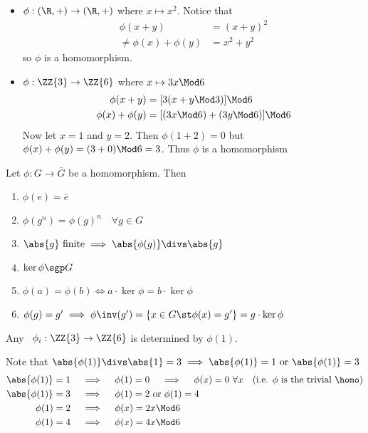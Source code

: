   \begin{nonexamples}
  \begin{itemize}
      \item \(\phi:(\R,+)\to (\R,+)\) where \(x\mapsto x^2\). Notice that
      \begin{align*}
          \phi(x+y)&=(x+y)^2 \\
          \neq \phi(x)+\phi(y) &= x^2+y^2
      \end{align*} so \(\phi\) is  a homomorphism.

      \item \(\phi:\ZZ{3}\to\ZZ{6}\) where \(x\mapsto 3x\Mod 6\)
      \begin{align*}
          \phi(x+y) &= [3(x+y\Mod 3)]\Mod 6 \\
          \phi(x)+\phi(y) &= [(3x\Mod 6) + (3y\Mod 6)]\Mod 6
      \end{align*}
      Now let \(x=1\) and \(y=2\). Then \(\phi(1+2)=0\) but \(\phi(x)+\phi(y)=(3+0)\Mod 6 = 3\). Thus \(\phi\) is  a homomorphism
  \end{itemize}
  \end{nonexamples}

  \begin{theorem}
      Let \(\phi: G\to\bar G\) be a homomorphism. Then
      \begin{enumerate}
          \item \(\phi(e)=\bar e\)
          \item \(\phi(g^n)=\phi(g)^n\quad \forall g\in G\)
          \item \(\abs{g}\text{ finite} \implies \abs{\phi(g)} \divs \abs{g}\)
          \item \(\ker\phi \sgp G\)
          \item \(\phi(a) = \phi(b) \iff a\cdot\ker\phi = b\cdot\ker\phi\)
          \item \(\phi(g)=g'\implies \phi\inv(g')=\{x\in G \st \phi(x)=g'\} = g\cdot \ker\phi\)
      \end{enumerate}
  \end{theorem}

  \begin{example}
      Any \homo\ \(\phi_i: \ZZ{3}\to\ZZ{6}\) is determined by \(\phi(1)\).

      Note that \(\abs{\phi (1)} \divs \abs{1} = 3 \implies \abs{\phi (1)}=1 \text{ or } \abs{\phi (1)}=3\)
      \begin{align*}
          \abs{\phi(1)} = 1 \quad &\implies \quad \phi(1)=0 \quad \implies \quad \phi(x)=0\ \forall x \quad \text{(i.e. \(\phi\) is the trivial \homo)} \\
          \abs{\phi(1)} = 3 \quad &\implies \quad \phi(1)=2 \text{ or } \phi(1)=4 \\
          \phi(1) = 2 \quad &\implies \quad \phi(x)=2x \Mod 6 \\
          \phi(1) = 4 \quad &\implies \quad \phi(x)=4x \Mod 6
      \end{align*}
  \end{example}


